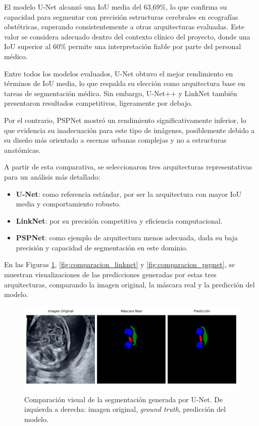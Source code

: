 El modelo U-Net alcanzó una IoU media del 63,69\%, lo que confirma su capacidad para segmentar con precisión estructuras cerebrales en ecografías obstétricas, superando consistentemente a otras arquitecturas evaluadas. Este valor se considera adecuado dentro del contexto clínico del proyecto, donde una IoU superior al 60\% permite una interpretación fiable por parte del personal médico.

Entre todos los modelos evaluados, U-Net obtuvo el mejor rendimiento en términos de IoU media, lo que respalda su elección como arquitectura base en tareas de segmentación médica. Sin embargo, U-Net++ y LinkNet también presentaron resultados competitivos, ligeramente por debajo.

Por el contrario, PSPNet mostró un rendimiento significativamente inferior, lo que evidencia su inadecuación para este tipo de imágenes, posiblemente debido a su diseño más orientado a escenas urbanas complejas y no a estructuras anatómicas.

A partir de esta comparativa, se seleccionaron tres arquitecturas representativas para un análisis más detallado:

\begin{itemize}
    \item \textbf{U-Net}: como referencia estándar, por ser la arquitectura con mayor IoU media y comportamiento robusto.
    \item \textbf{LinkNet}: por su precisión competitiva y eficiencia computacional.
    \item \textbf{PSPNet}: como ejemplo de arquitectura menos adecuada, dada su baja precisión y capacidad de segmentación en este dominio.
\end{itemize}

En las Figuras \ref{fig:comparacion_unet}, \ref{fig:comparacion_linknet} y \ref{fig:comparacion_pspnet}, se muestran visualizaciones de las predicciones generadas por estas tres arquitecturas, comparando la imagen original, la máscara real y la predicción del modelo.

\begin{figure}[h]
    \centering
    \includegraphics[width=1\textwidth]{img/image1_unet.png}
    \caption{Comparación visual de la segmentación generada por U-Net. De izquierda a derecha: imagen original, \textit{ground truth}, predicción del modelo. }
    \label{fig:comparacion_unet}
\end{figure}

